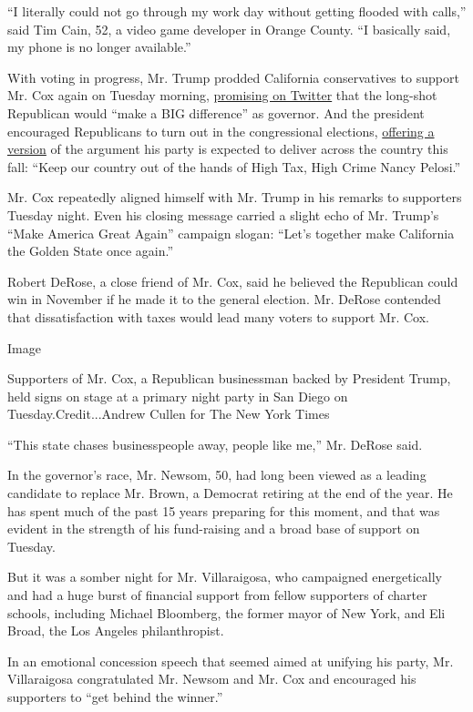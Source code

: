``I literally could not go through my work day without getting flooded
with calls,'' said Tim Cain, 52, a video game developer in Orange
County. ``I basically said, my phone is no longer available.''

With voting in progress, Mr. Trump prodded California conservatives to
support Mr. Cox again on Tuesday morning,
\href{https://twitter.com/realDonaldTrump/status/1003985427970314246}{promising
on Twitter} that the long-shot Republican would ``make a BIG
difference'' as governor. And the president encouraged Republicans to
turn out in the congressional elections,
\href{https://twitter.com/realDonaldTrump/status/1003987298072002565}{offering
a version} of the argument his party is expected to deliver across the
country this fall: ``Keep our country out of the hands of High Tax, High
Crime Nancy Pelosi.''

Mr. Cox repeatedly aligned himself with Mr. Trump in his remarks to
supporters Tuesday night. Even his closing message carried a slight echo
of Mr. Trump's ``Make America Great Again'' campaign slogan: ``Let's
together make California the Golden State once again.''

Robert DeRose, a close friend of Mr. Cox, said he believed the
Republican could win in November if he made it to the general election.
Mr. DeRose contended that dissatisfaction with taxes would lead many
voters to support Mr. Cox.

Image

Supporters of Mr. Cox, a Republican businessman backed by President
Trump, held signs on stage at a primary night party in San Diego on
Tuesday.Credit...Andrew Cullen for The New York Times

``This state chases businesspeople away, people like me,'' Mr. DeRose
said.

In the governor's race, Mr. Newsom, 50, had long been viewed as a
leading candidate to replace Mr. Brown, a Democrat retiring at the end
of the year. He has spent much of the past 15 years preparing for this
moment, and that was evident in the strength of his fund-raising and a
broad base of support on Tuesday.

But it was a somber night for Mr. Villaraigosa, who campaigned
energetically and had a huge burst of financial support from fellow
supporters of charter schools, including Michael Bloomberg, the former
mayor of New York, and Eli Broad, the Los Angeles philanthropist.

In an emotional concession speech that seemed aimed at unifying his
party, Mr. Villaraigosa congratulated Mr. Newsom and Mr. Cox and
encouraged his supporters to ``get behind the winner.''

